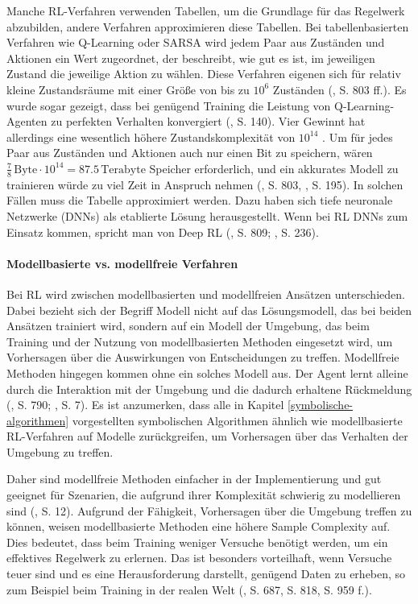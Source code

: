 Manche RL-Verfahren verwenden Tabellen, um die Grundlage für das Regelwerk abzubilden, andere Verfahren approximieren diese Tabellen. Bei tabellenbasierten Verfahren wie Q-Learning oder SARSA wird jedem Paar aus Zuständen und Aktionen ein Wert zugeordnet, der beschreibt, wie gut es ist, im jeweiligen Zustand die jeweilige Aktion zu wählen. Diese Verfahren eigenen sich für relativ kleine Zustandsräume mit einer Größe von bis zu $10^{6}$ Zuständen (\cite{Russell.2020}, S. 803 ff.). Es wurde sogar gezeigt, dass bei genügend Training die Leistung von Q-Learning-Agenten zu perfekten Verhalten konvergiert (\cite{Sutton.2018}, S. 140). Vier Gewinnt hat allerdings eine wesentlich höhere Zustandskomplexität von $10^{14}$ \cite{Allis.1994}. Um für jedes Paar aus Zuständen und Aktionen auch nur einen Bit zu speichern, wären $\frac{7}{8} \, \text{Byte} \cdot 10^{14} = 87.5 \, \text{Terabyte}$ Speicher erforderlich, und ein akkurates Modell zu trainieren würde zu viel Zeit in Anspruch nehmen (\cite{Russell.2020}, S. 803, \cite{Sutton.2018}, S. 195). In solchen Fällen muss die Tabelle approximiert werden. Dazu haben sich tiefe neuronale Netzwerke (DNNs) als etablierte Lösung herausgestellt. Wenn bei RL DNNs zum Einsatz kommen, spricht man von Deep RL (\cite{Russell.2020}, S. 809; \cite{Sutton.2018}, S. 236).

\paragraph{Modellbasierte vs. modellfreie Verfahren}

Bei RL wird zwischen modellbasierten und modellfreien Ansätzen unterschieden. Dabei bezieht sich der Begriff \glqq Modell\grqq{} nicht auf das Lösungsmodell, das bei beiden Ansätzen trainiert wird, sondern auf ein Modell der Umgebung, das beim Training und der Nutzung von modellbasierten Methoden eingesetzt wird, um Vorhersagen über die Auswirkungen von Entscheidungen zu treffen. Modellfreie Methoden hingegen kommen ohne ein solches Modell aus. Der Agent lernt alleine durch die Interaktion mit der Umgebung und die dadurch erhaltene Rückmeldung (\cite{Russell.2020}, S. 790; \cite{Sutton.2018}, S. 7). Es ist anzumerken, dass alle in Kapitel \ref{symbolische-algorithmen} vorgestellten symbolischen Algorithmen ähnlich wie modellbasierte RL-Verfahren auf Modelle zurückgreifen, um Vorhersagen über das Verhalten der Umgebung zu treffen.

Daher sind modellfreie Methoden einfacher in der Implementierung und gut geeignet für Szenarien, die aufgrund ihrer Komplexität schwierig zu modellieren sind (\cite{Sutton.2018}, S. 12). Aufgrund der Fähigkeit, Vorhersagen über die Umgebung treffen zu können, weisen modellbasierte Methoden eine höhere Sample Complexity auf. Dies bedeutet, dass beim Training weniger Versuche benötigt werden, um ein effektives Regelwerk zu erlernen. Das ist besonders vorteilhaft, wenn Versuche teuer sind und es eine Herausforderung darstellt, genügend Daten zu erheben, so zum Beispiel beim Training in der realen Welt (\cite{Russell.2020}, S. 687, S. 818, S. 959 f.).

